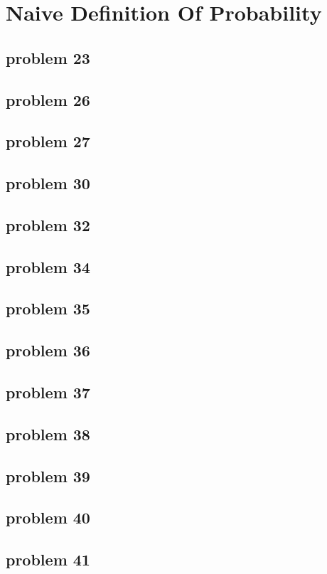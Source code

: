 \section{Naive Definition Of Probability}

\subsection{problem 23}


\subsection{problem 26}


\subsection{problem 27}


\subsection{problem 30}


\subsection{problem 32}


\subsection{problem 34}


\subsection{problem 35}


\subsection{problem 36}


\subsection{problem 37}


\subsection{problem 38}


\subsection{problem 39}


\subsection{problem 40}


\subsection{problem 41}
